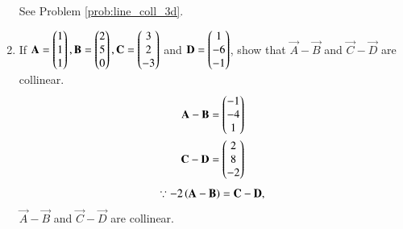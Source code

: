 \begin{enumerate}[label=\arabic*.,ref=\thesubsection.\theenumi]
%
\\
\solution See Problem \ref{prob:line_coll_3d}.
\item If 
$\mathbf{A}=\begin{pmatrix}1\\1\\1\end{pmatrix}, \mathbf{B}=\begin{pmatrix}2\\5\\0\end{pmatrix}, \mathbf{C}=\begin{pmatrix}3\\2\\-3\end{pmatrix}$  and $ \mathbf{D}=\begin{pmatrix}1\\-6\\-1\end{pmatrix}$,
show that  $\vec{A}-\vec{B}$ and $\vec{C}-\vec{D}$ are collinear.
%
\\
\solution 
%
\begin{align}
\mathbf{A}-\mathbf{B} &= \begin{pmatrix}-1\\-4\\1\end{pmatrix}
\\
\mathbf{C}-\mathbf{D} &= \begin{pmatrix}2\\8\\-2\end{pmatrix}
\end{align}
%
%
\begin{align}
\because -2\left(\mathbf{A}-\mathbf{B}\right) =  \mathbf{C}-\mathbf{D},
\end{align}
%
$\vec{A}-\vec{B}$ and $\vec{C}-\vec{D}$ are collinear.


\end{enumerate}
